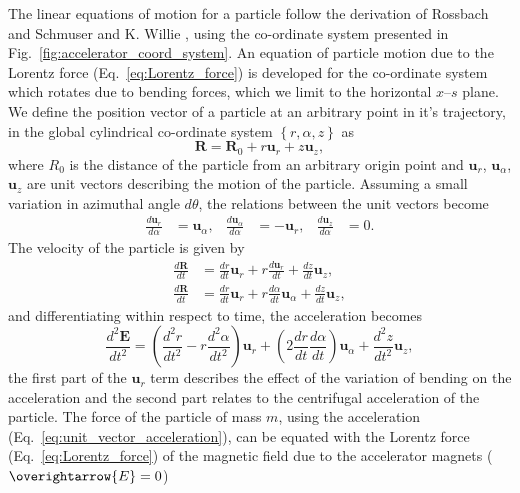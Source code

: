 \documentclass[../main.tex]{subfiles}
\begin{document}
The linear equations of motion for a particle follow the derivation of Rossbach and Schmuser \cite{rossbach1993basic} and K. Willie \cite{wille2000physics}, using the co-ordinate system presented in Fig.~\ref{fig:accelerator_coord_system}. An equation of particle motion due to the Lorentz force (Eq.~\ref{eq:Lorentz_force}) is developed for the co-ordinate system which rotates due to bending forces, which we limit to the horizontal $x$--$s$ plane. We define the position vector of a particle at an arbitrary point in it's trajectory, in the global cylindrical co-ordinate system $\left\{r,\alpha,z\right\}$ as
\begin{equation}
\boldsymbol{R} = \boldsymbol{R}_{0} + r\boldsymbol{u}_{r} + z\boldsymbol{u}_{z},    
\label{eq:particle_position_vector}
\end{equation}
where $R_{0}$ is the distance of the particle from an arbitrary origin point and $\boldsymbol{u}_{r}$, $\boldsymbol{u}_{\alpha}$, $\boldsymbol{u}_{z}$ are unit vectors describing the motion of the particle. Assuming a small variation in azimuthal angle $d\theta$, the relations between the unit vectors become
\begin{align}
\frac{d\boldsymbol{u}_{r}}{d\alpha} &= \boldsymbol{u}_{\alpha}, & \frac{d\boldsymbol{u}_{\alpha}}{d\alpha} &= -\boldsymbol{u}_{r}, & \frac{d\boldsymbol{u}_{z}}{d\alpha} &= 0.
\label{eq:unit_vector_angular_derivatives}    
\end{align}
The velocity of the particle is given by
\begin{align}
\frac{d\boldsymbol{R}}{dt} &= \frac{dr}{dt}\boldsymbol{u}_{r}+r\frac{d\boldsymbol{u}_{r}}{dt} +\frac{dz}{dt}\boldsymbol{u}_{z}, \nonumber \\
\frac{d\boldsymbol{R}}{dt} &= \frac{dr}{dt}\boldsymbol{u}_{r} + r\frac{d\alpha}{dt}\boldsymbol{u}_{\alpha} + \frac{dz}{dt}\boldsymbol{u}_{z},
\label{eq:unit_vector_velocity}    
\end{align}
and differentiating within respect to time, the acceleration becomes
\begin{equation}
\frac{d^{2}\boldsymbol{E}}{dt^{2}} = \left(\frac{d^{2}r}{dt^{2}}-r\frac{d^{2}\alpha}{dt^{2}}\right)\boldsymbol{u}_{r} + \left(2\frac{dr}{dt}\frac{d\alpha}{dt}\right)\boldsymbol{u}_{\alpha} + \frac{d^{2}z}{dt^{2}}\boldsymbol{u}_{z},
\label{eq:unit_vector_acceleration}    
\end{equation}
the first part of the $\boldsymbol{u}_{r}$ term describes the effect of the variation of bending on the acceleration and the second part relates to the centrifugal acceleration of the particle. The force of the particle of mass $m$, using the acceleration (Eq.~\ref{eq:unit_vector_acceleration}), can be equated with the Lorentz force (Eq.~\ref{eq:Lorentz_force}) of the magnetic field due to the accelerator magnets ($\overightarrow{E}=0$)
\end{document}
